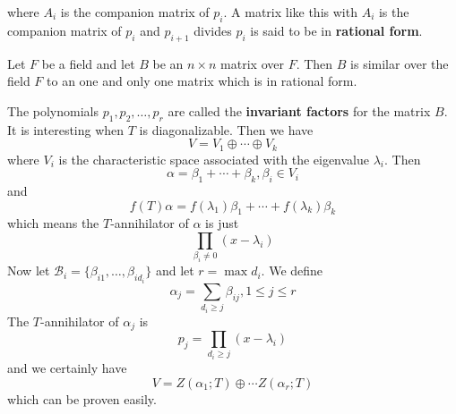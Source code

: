 \documentclass{article}
\begin{document}
where $A_i$ is the companion matrix of $p_i$. A matrix like this with $A_i$ is the companion matrix of $p_i$ and $p_{i+1}$ divides $p_i$ is said to be in \textbf{rational form}.
\begin{thm}
	Let $F$ be a field and let $B$ be an $n\times n$ matrix over $F$. Then $B$ is similar over the field $F$ to an one and only one matrix which is in rational form.
\end{thm}
The polynomials $p_1,p_2,\dots,p_r$ are called the \textbf{invariant factors} for the matrix $B$.\\
\indent It is interesting when $T$ is diagonalizable. Then we have
\[V=V_1\oplus\cdots\oplus V_k\]
where $V_i$ is the characteristic space associated with the eigenvalue $\lambda_i$. Then
\[\alpha=\beta_1+\cdots+\beta_k,\beta_i\in V_i\]
and
\[f(T)\alpha=f(\lambda_1)\beta_1+\cdots+f(\lambda_k)\beta_k\]
which means the $T$-annihilator of $\alpha$ is just
\[\prod_{\beta_i\neq0}(x-\lambda_i)\]
Now let $\mathcal{B}_i=\{\beta_{i1},\dots,\beta_{id_i}\}$ and let $r=\max d_i$. We define
\[\alpha_j=\sum_{d_i\ge j}\beta_{ij},1\le j\le r\]
The $T$-annihilator of $\alpha_j$ is
\[p_j=\prod_{d_i\ge j}(x-\lambda_i)\]
and we certainly have
\[V=Z(\alpha_1;T)\oplus\cdots Z(\alpha_r;T)\]
which can be proven easily. 
\end{document}
